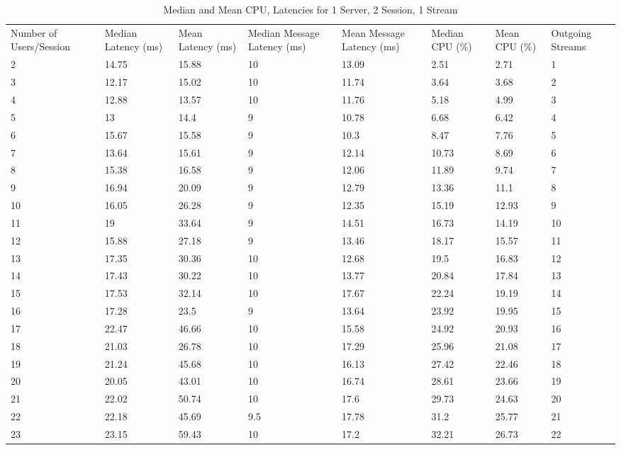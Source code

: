 \begin{table}
\caption{Median and Mean CPU, Latencies for 1 Server, 2 Session, 1 Stream}
\label{table:1serv_2sess_1str}
\begin{tabu} to\linewidth{|X[c]|X[c]|X[c]|X[c]|X[c]|X[c]|X[c]|X[c]|}
\everyrow{\hline}
\hline
Number of Users/Session & Median Latency (ms) & Mean Latency (ms) & Median Message Latency (ms) & Mean Message Latency (ms) & Median CPU (\%) & Mean CPU (\%) & Outgoing Streams\\
2 & 14.75 & 15.88 & 10 & 13.09 & 2.51 & 2.71 & 1 \\
3 & 12.17 & 15.02 & 10 & 11.74 & 3.64 & 3.68 & 2 \\
4 & 12.88 & 13.57 & 10 & 11.76 & 5.18 & 4.99 & 3 \\
5 & 13 & 14.4 & 9 & 10.78 & 6.68 & 6.42 & 4 \\
6 & 15.67 & 15.58 & 9 & 10.3 & 8.47 & 7.76 & 5 \\
7 & 13.64 & 15.61 & 9 & 12.14 & 10.73 & 8.69 & 6 \\
8 & 15.38 & 16.58 & 9 & 12.06 & 11.89 & 9.74 & 7 \\
9 & 16.94 & 20.09 & 9 & 12.79 & 13.36 & 11.1 & 8 \\
10 & 16.05 & 26.28 & 9 & 12.35 & 15.19 & 12.93 & 9 \\
11 & 19 & 33.64 & 9 & 14.51 & 16.73 & 14.19 & 10 \\
12 & 15.88 & 27.18 & 9 & 13.46 & 18.17 & 15.57 & 11 \\
13 & 17.35 & 30.36 & 10 & 12.68 & 19.5 & 16.83 & 12 \\
14 & 17.43 & 30.22 & 10 & 13.77 & 20.84 & 17.84 & 13 \\
15 & 17.53 & 32.14 & 10 & 17.67 & 22.24 & 19.19 & 14 \\
16 & 17.28 & 23.5 & 9 & 13.64 & 23.92 & 19.95 & 15 \\
17 & 22.47 & 46.66 & 10 & 15.58 & 24.92 & 20.93 & 16 \\
18 & 21.03 & 26.78 & 10 & 17.29 & 25.96 & 21.08 & 17 \\
19 & 21.24 & 45.68 & 10 & 16.13 & 27.42 & 22.46 & 18 \\
20 & 20.05 & 43.01 & 10 & 16.74 & 28.61 & 23.66 & 19 \\
21 & 22.02 & 50.74 & 10 & 17.6 & 29.73 & 24.63 & 20 \\
22 & 22.18 & 45.69 & 9.5 & 17.78 & 31.2 & 25.77 & 21 \\
23 & 23.15 & 59.43 & 10 & 17.2 & 32.21 & 26.73 & 22 \\

\end{tabu}
\end{table}
